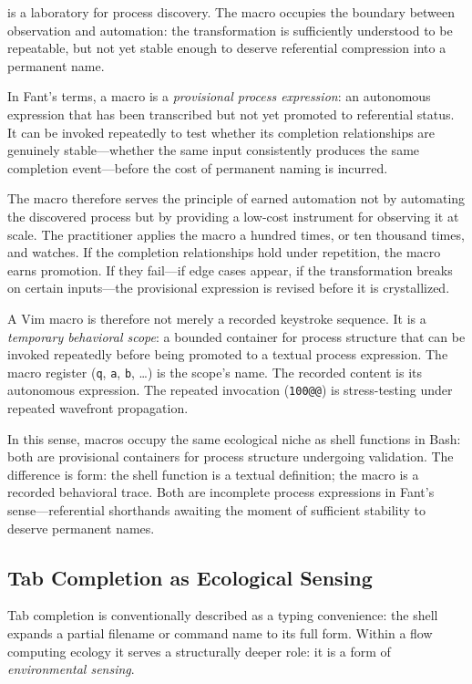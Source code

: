 \documentclass[12pt, a4paper]{article}
\begin{document}
is a laboratory for process discovery. The macro occupies the
boundary between observation and automation: the transformation
is sufficiently understood to be repeatable, but not yet stable
enough to deserve referential compression into a permanent name.

In Fant's terms, a macro is a \emph{provisional process
expression}: an autonomous expression that has been transcribed
but not yet promoted to referential status. It can be invoked
repeatedly to test whether its completion relationships are
genuinely stable---whether the same input consistently produces
the same completion event---before the cost of permanent naming
is incurred.

The macro therefore serves the principle of earned automation
not by automating the discovered process but by providing a
low-cost instrument for observing it at scale. The practitioner
applies the macro a hundred times, or ten thousand times, and
watches. If the completion relationships hold under repetition,
the macro earns promotion. If they fail---if edge cases appear,
if the transformation breaks on certain inputs---the provisional
expression is revised before it is crystallized.

A Vim macro is therefore not merely a recorded keystroke sequence.
It is a \emph{temporary behavioral scope}: a bounded container
for process structure that can be invoked repeatedly before being
promoted to a textual process expression. The macro register
(\texttt{q}, \texttt{a}, \texttt{b}, \ldots) is the scope's
name. The recorded content is its autonomous expression. The
repeated invocation (\texttt{100@@}) is stress-testing under
repeated wavefront propagation.

In this sense, macros occupy the same ecological niche as shell
functions in Bash: both are provisional containers for process
structure undergoing validation. The difference is form: the
shell function is a textual definition; the macro is a recorded
behavioral trace. Both are incomplete process expressions in
Fant's sense---referential shorthands awaiting the moment of
sufficient stability to deserve permanent names.

\subsection{Tab Completion as Ecological Sensing}

Tab completion is conventionally described as a typing convenience:
the shell expands a partial filename or command name to its full
form. Within a flow computing ecology it serves a structurally
deeper role: it is a form of \emph{environmental sensing}.
\end{document}
